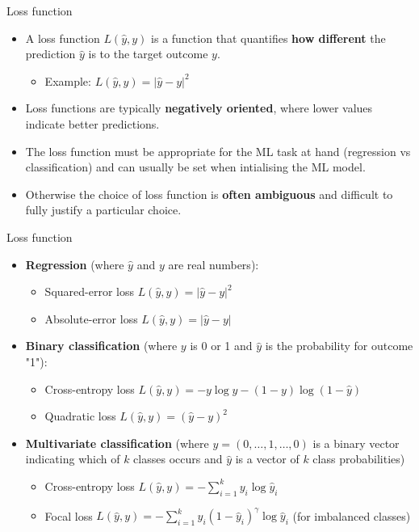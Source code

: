 \documentclass{beamer}
\begin{document}
\begin{frame}{Loss function}
\begin{itemize}
\item A loss function \(L(\hat{y},y)\) is a function that quantifies \textbf{how different} the prediction \(\hat{y}\) is to the target outcome \(y\).
\begin{itemize}
\item Example: \(L(\hat{y},y) = |\hat{y} - y|^2\)
\end{itemize}
\item Loss functions are typically \textbf{negatively oriented}, where lower values indicate better predictions.
\item The loss function must be appropriate for the ML task at hand (regression vs classification) and can usually be set when intialising the ML model.
\item Otherwise the choice of loss function is \textbf{often ambiguous} and difficult to fully justify a particular choice.
\end{itemize}
\end{frame}


\begin{frame}{Loss function}
\begin{itemize}
\item \textbf{Regression} (where \(\hat{y}\) and \(y\) are real numbers):
\begin{itemize}
\item Squared-error loss \(L(\hat{y},y) = |\hat{y} - y|^2\)
\item Absolute-error loss \(L(\hat{y},y) = |\hat{y} - y|\)
\end{itemize}
\item \textbf{Binary classification} (where \(y\) is 0 or 1 and \(\hat{y}\) is the probability for outcome "1"):
\begin{itemize}
\item Cross-entropy loss \(L(\hat{y},y) = -y\log\hat{y} - (1-y)\log(1-\hat{y})\)
\item Quadratic loss \(L(\hat{y},y) = (\hat{y} - y)^2\)
\end{itemize}
\item \textbf{Multivariate classification} (where \(y = (0,\dots,1,\dots,0)\) is a binary vector indicating which of \(k\) classes occurs and \(\hat{y}\) is a vector of \(k\) class probabilities)
\begin{itemize}
\item Cross-entropy loss \(L(\hat{y},y) = - \sum_{i=1}^k y_i \log \hat{y}_i\)
\item Focal loss \(L(\hat{y},y) = - \sum_{i=1}^k y_i (1-\hat{y}_i)^\gamma \log \hat{y}_i\) (for imbalanced classes)
\end{itemize}
\end{itemize}
\end{frame}
\end{document}
